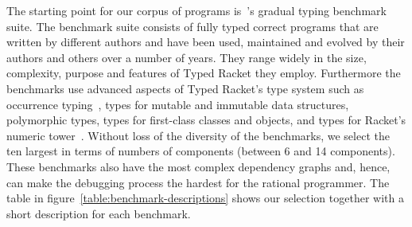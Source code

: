 The starting point for our corpus of programs
is~\citet{gtnffvf-jfp-2019}'s gradual typing benchmark suite. The
benchmark suite consists of fully typed correct programs that are written by different authors
and have been used, maintained and evolved by their authors and others over a
number of years.  They range widely in the size, complexity, purpose and
features of Typed Racket they employ.  Furthermore the benchmarks use advanced aspects
of Typed Racket's type system such as occurrence
typing~\cite{tf-icfp-2010}, types for mutable and immutable data
structures, polymorphic types, types for first-class classes and objects, and types for
Racket's numeric tower~\cite{stathff-padl-12}. Without loss of the diversity of the benchmarks,
we select the ten largest in terms of numbers of components (between 6 and 14 components).
These benchmarks also have the most complex dependency graphs and, hence,
can make the debugging process the hardest for the rational programmer.
The table in figure~\ref{table:benchmark-descriptions} shows our selection
together with a short description for each benchmark.

